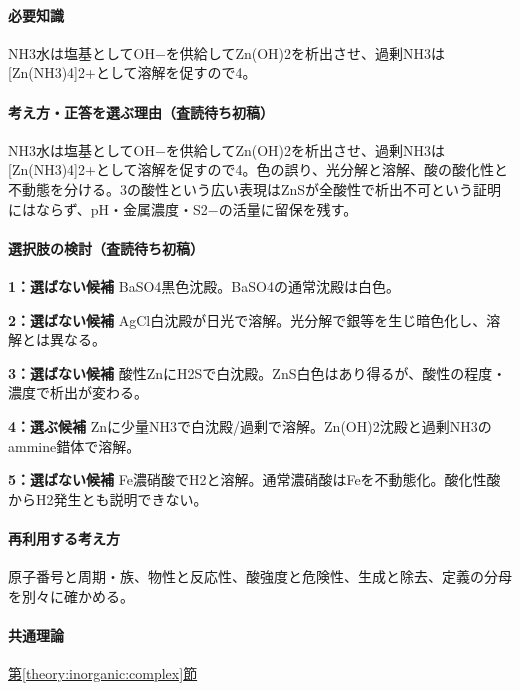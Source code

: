 \paragraph{必要知識} NH3水は塩基としてOH−を供給してZn(OH)2を析出させ、過剰NH3は[Zn(NH3)4]2+として溶解を促すので4。

\paragraph{考え方・正答を選ぶ理由（査読待ち初稿）} NH3水は塩基としてOH−を供給してZn(OH)2を析出させ、過剰NH3は[Zn(NH3)4]2+として溶解を促すので4。色の誤り、光分解と溶解、酸の酸化性と不動態を分ける。3の酸性という広い表現はZnSが全酸性で析出不可という証明にはならず、pH・金属濃度・S2−の活量に留保を残す。

\paragraph{選択肢の検討（査読待ち初稿）}\mbox{}\par

\noindent\textbf{1：選ばない候補} BaSO4黒色沈殿。BaSO4の通常沈殿は白色。\par

\noindent\textbf{2：選ばない候補} AgCl白沈殿が日光で溶解。光分解で銀等を生じ暗色化し、溶解とは異なる。\par

\noindent\textbf{3：選ばない候補} 酸性ZnにH2Sで白沈殿。ZnS白色はあり得るが、酸性の程度・濃度で析出が変わる。\par

\noindent\textbf{4：選ぶ候補} Znに少量NH3で白沈殿/過剰で溶解。Zn(OH)2沈殿と過剰NH3のammine錯体で溶解。\par

\noindent\textbf{5：選ばない候補} Fe濃硝酸でH2と溶解。通常濃硝酸はFeを不動態化。酸化性酸からH2発生とも説明できない。\par

\paragraph{再利用する考え方} 原子番号と周期・族、物性と反応性、酸強度と危険性、生成と除去、定義の分母を別々に確かめる。

\paragraph{共通理論} \hyperref[theory:inorganic:complex]{第\ref*{theory:inorganic:complex}節}

